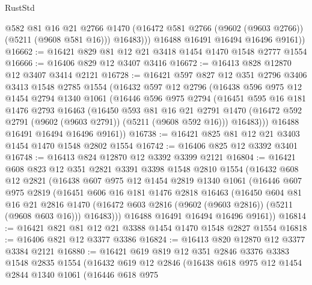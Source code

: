 \begin{lexlean}{RustStd}
\begin{coremodule}
              @582
              @81
              @16
              @21
              @2766
              @1470
              (@16472 @581 @2766 (@9602 (@9603 @2766)) (@5211 (@9608 @581 @16)))
              @16483)))
        @16488
        @16491
        @16494
        @16496
        @9161))
@16662 := @16421 @829 @81 @12 @21 @3418 @1454 @1470 @1548 @2777 @1554
@16666 := @16406 @829 @12 @3407 @3416
@16672 := @16413 @828 @12870 @12 @3407 @3414 @2121
@16728 := @16421
    @597
    @827
    @12
    @351
    @2796
    @3406
    @3413
    @1548
    @2785
    @1554
    (@16432
      @597
      @12
      @2796
      (@16438
        @596
        @975
        @12
        @1454
        @2794
        @1340
        @1061
        (@16446
          @596
          @975
          @2794
          (@16451
            @595
            @16
            @181
            @1476
            @2793
            @16463
            (@16450
              @593
              @81
              @16
              @21
              @2791
              @1470
              (@16472 @592 @2791 (@9602 (@9603 @2791)) (@5211 (@9608 @592 @16)))
              @16483)))
        @16488
        @16491
        @16494
        @16496
        @9161))
@16738 := @16421 @825 @81 @12 @21 @3403 @1454 @1470 @1548 @2802 @1554
@16742 := @16406 @825 @12 @3392 @3401
@16748 := @16413 @824 @12870 @12 @3392 @3399 @2121
@16804 := @16421
    @608
    @823
    @12
    @351
    @2821
    @3391
    @3398
    @1548
    @2810
    @1554
    (@16432
      @608
      @12
      @2821
      (@16438
        @607
        @975
        @12
        @1454
        @2819
        @1340
        @1061
        (@16446
          @607
          @975
          @2819
          (@16451
            @606
            @16
            @181
            @1476
            @2818
            @16463
            (@16450
              @604
              @81
              @16
              @21
              @2816
              @1470
              (@16472 @603 @2816 (@9602 (@9603 @2816)) (@5211 (@9608 @603 @16)))
              @16483)))
        @16488
        @16491
        @16494
        @16496
        @9161))
@16814 := @16421 @821 @81 @12 @21 @3388 @1454 @1470 @1548 @2827 @1554
@16818 := @16406 @821 @12 @3377 @3386
@16824 := @16413 @820 @12870 @12 @3377 @3384 @2121
@16880 := @16421
    @619
    @819
    @12
    @351
    @2846
    @3376
    @3383
    @1548
    @2835
    @1554
    (@16432
      @619
      @12
      @2846
      (@16438
        @618
        @975
        @12
        @1454
        @2844
        @1340
        @1061
        (@16446
          @618
          @975

\end{coremodule}
\end{lexlean}
